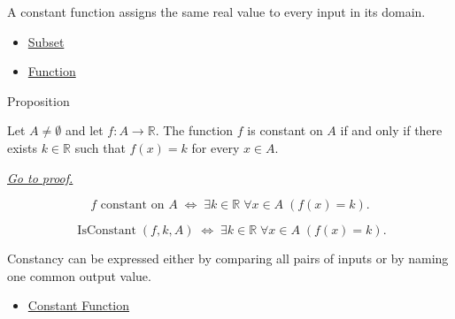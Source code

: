 \begin{remark*}[Interpretation]
A constant function assigns the same real value to every input in its domain.
\end{remark*}

\begin{dependencies}
\begin{itemize}
  \item \hyperref[def:subset]{Subset}
  \item \hyperref[def:function]{Function}
\end{itemize}
\end{dependencies}

\begin{propositionbox}{Proposition}
\begin{proposition}
\label{prop:constant-function-characterization}
Let \(A\neq\emptyset\) and let \(f:A\to\mathbb{R}\).  The function \(f\)
is constant on \(A\) if and only if there exists \(k\in\mathbb{R}\) such
that \(f(x)=k\) for every \(x\in A\).

\smallskip\noindent
\hyperref[prf:constant-function-characterization]{\textit{Go to proof.}}
\end{proposition}
\end{propositionbox}

\begin{remark*}
\[
  f\text{ constant on }A
  \;\Longleftrightarrow\;
  \exists k\in\mathbb{R}\;\forall x\in A\;(f(x)=k).
\]
\end{remark*}

\begin{remark*}
\[
  \operatorname{IsConstant}(f,k,A)
  \;\Longleftrightarrow\;
  \exists k\in\mathbb{R}\;\forall x\in A\;(f(x)=k).
\]
\end{remark*}

\begin{remark*}[Interpretation]
Constancy can be expressed either by comparing all pairs of inputs or by
naming one common output value.
\end{remark*}

\begin{dependencies}
\begin{itemize}
  \item \hyperref[def:function-constant]{Constant Function}
\end{itemize}
\end{dependencies}

